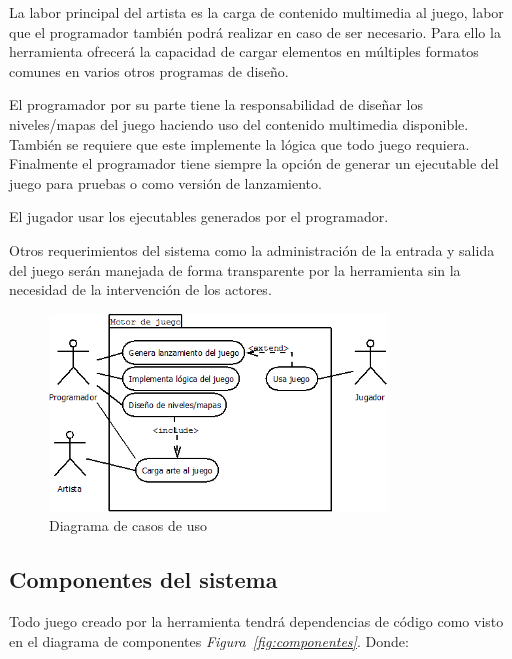 La labor principal del artista es la carga de contenido multimedia al juego, labor que el programador también podrá realizar en caso de ser necesario. Para ello la herramienta ofrecerá la capacidad de cargar elementos en múltiples formatos comunes en varios otros programas de diseño.

El programador por su parte tiene la responsabilidad de diseñar los niveles/mapas del juego haciendo uso del contenido multimedia disponible. También se requiere que este implemente la lógica que todo juego requiera. Finalmente el programador tiene siempre la opción de generar un ejecutable del juego para pruebas o como versión de lanzamiento.

El jugador usar los ejecutables generados por el programador.

Otros requerimientos del sistema como la administración de la entrada y salida del juego serán manejada de forma transparente por la herramienta sin la necesidad de la intervención de los actores.

\begin{figure}[!htbp!]
\centering
\includegraphics[width=0.8\textwidth]{MCU}
\caption[Diagrama de casos de uso]{Diagrama de casos de uso}
\label{fig:MCU}
\end{figure}

\subsection{Componentes del sistema}

Todo juego creado por la herramienta tendrá dependencias de código como visto en el diagrama de componentes \emph{Figura~\ref{fig:componentes}}. Donde:

